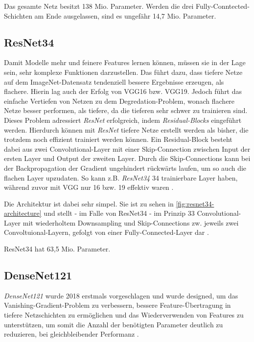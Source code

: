 Das gesamte Netz besitzt 138 Mio. Parameter. Werden die drei Fully-Conntected-Schichten am Ende ausgelassen, 
sind es ungefähr 14,7 Mio. Parameter. 

\subsection{ResNet34} \label{sec:pretrained-backbones:resnet}

Damit Modelle mehr und feinere Features lernen können, müssen sie in der Lage sein, sehr komplexe Funktionen darzustellen. 
Das führt dazu, dass tiefere Netze auf dem ImageNet-Datensatz tendenziell bessere Ergebnisse erzeugen, als flachere. 
Hierin lag auch der Erfolg von VGG16 bzw. VGG19. Jedoch führt das einfache Vertiefen von Netzen zu dem Degredation-Problem, wonach 
flachere Netze besser performen, als tiefere, da die tieferen sehr schwer zu trainieren sind. \\
Dieses Problem adressiert \textit{ResNet} erfolgreich, indem \textit{Residual-Blocks} eingeführt werden. 
Hierdurch können mit \textit{ResNet} tiefere Netze erstellt werden als bisher, die trotzdem noch effizient trainiert werden können.
Ein Residual-Block besteht dabei aus zwei Convolutional-Layer mit einer Skip-Connection zwischen Input der ersten Layer und Output 
der zweiten Layer. Durch die Skip-Connections kann bei der Backpropagation der Gradient ungehindert rückwärts laufen, 
um so auch die flachen Layer upzudaten. So kann z.B. \textit{ResNet34} 34 trainierbare Layer haben, 
während zuvor mit VGG nur 16 bzw. 19 effektiv waren \cite{He.10122015}. 

Die Architektur ist dabei sehr simpel. Sie ist zu sehen in \autoref{fig:resnet34-architecture} 
und stellt - im Falle von ResNet34 - im Prinzip 33 Convolutional-Layer mit wiederholtem Downsampling 
und Skip-Connections zw. jeweils zwei Convoltuional-Layern, gefolgt von einer Fully-Connected-Layer dar \cite{He.10122015}.

ResNet34 hat 63,5 Mio. Parameter. 


\subsection{DenseNet121} \label{sec:pretrained-backbones:densenet121}

\textit{DenseNet121} wurde 2018 erstmals vorgeschlagen und wurde designed, um das Vanishing-Gradient-Problem 
zu verbessern, bessere Feature-Übertragung in tiefere Netzschichten zu ermöglichen und das Wiederverwenden von Features 
zu unterstützen, um somit die Anzahl der benötigten Parameter deutlich zu reduzieren, bei gleichbleibender Performanz \cite{Huang.25082016}.

